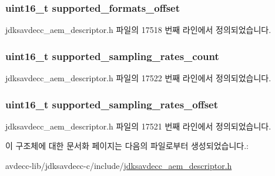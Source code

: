 \subsubsection[{\texorpdfstring{supported\+\_\+formats\+\_\+offset}{supported_formats_offset}}]{\setlength{\rightskip}{0pt plus 5cm}uint16\+\_\+t supported\+\_\+formats\+\_\+offset}\hypertarget{structjdksavdecc__descriptor__sensor__unit__cluster_a3484053d0dc58698d796644a57273dcb}{}\label{structjdksavdecc__descriptor__sensor__unit__cluster_a3484053d0dc58698d796644a57273dcb}


jdksavdecc\+\_\+aem\+\_\+descriptor.\+h 파일의 17518 번째 라인에서 정의되었습니다.

\subsubsection[{\texorpdfstring{supported\+\_\+sampling\+\_\+rates\+\_\+count}{supported_sampling_rates_count}}]{\setlength{\rightskip}{0pt plus 5cm}uint16\+\_\+t supported\+\_\+sampling\+\_\+rates\+\_\+count}\hypertarget{structjdksavdecc__descriptor__sensor__unit__cluster_a976ed67e20174bbc1a9988dc8f577fd8}{}\label{structjdksavdecc__descriptor__sensor__unit__cluster_a976ed67e20174bbc1a9988dc8f577fd8}


jdksavdecc\+\_\+aem\+\_\+descriptor.\+h 파일의 17522 번째 라인에서 정의되었습니다.

\subsubsection[{\texorpdfstring{supported\+\_\+sampling\+\_\+rates\+\_\+offset}{supported_sampling_rates_offset}}]{\setlength{\rightskip}{0pt plus 5cm}uint16\+\_\+t supported\+\_\+sampling\+\_\+rates\+\_\+offset}\hypertarget{structjdksavdecc__descriptor__sensor__unit__cluster_a07e4720cf58229a78c3c0939837b6228}{}\label{structjdksavdecc__descriptor__sensor__unit__cluster_a07e4720cf58229a78c3c0939837b6228}


jdksavdecc\+\_\+aem\+\_\+descriptor.\+h 파일의 17521 번째 라인에서 정의되었습니다.



이 구조체에 대한 문서화 페이지는 다음의 파일로부터 생성되었습니다.\+:\begin{DoxyCompactItemize}
\item 
avdecc-\/lib/jdksavdecc-\/c/include/\hyperlink{jdksavdecc__aem__descriptor_8h}{jdksavdecc\+\_\+aem\+\_\+descriptor.\+h}\end{DoxyCompactItemize}
